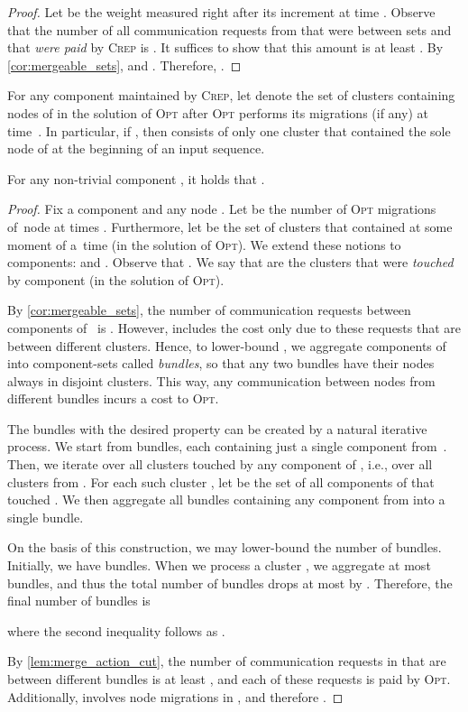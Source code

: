 \documentclass{siamart190516}
\newcommand{\OPT}{\textsc{Opt}\xspace}
\newcommand{\CREP}{\textsc{Crep}\xspace}
\begin{document}
\begin{proof}
Let  be the weight measured right after its increment at time .
Observe that the number of all communication requests from  that were
between sets  and that \emph{were paid} by \CREP is . It suffices to show that this amount is at least . By \cref{cor:mergeable_sets},  and . Therefore, .
\end{proof}

For any component  maintained by \CREP, let  denote the set of clusters
containing nodes of  in the solution of \OPT after \OPT performs its
migrations (if any) at time~. In particular, if , then
 consists of only one cluster that contained the sole node of  
at the beginning of an input sequence.

\begin{lemma}
\label{lem:opt_recursive_bound}
For any non-trivial component , it holds that .
\end{lemma}

\begin{proof}
Fix a component  and any node . Let  be the
number of \OPT migrations of~node  at times . Furthermore, let  be the set of clusters that
contained  at some moment of a~time  (in the solution of \OPT). We extend these notions to components:
 and .
Observe that .
We say that  are the clusters that were \emph{touched} by component  
(in the solution of \OPT).

By \cref{cor:mergeable_sets}, the number of communication requests between
components of~ is . However, 
includes the cost only due to these requests that are between different clusters.
Hence, to lower-bound , we aggregate components of~ into
component-sets called \emph{bundles}, so that any two bundles have their nodes
always in disjoint clusters. This way, any communication between nodes from
different bundles incurs a cost to \OPT.

The bundles with the desired property can be created by a natural iterative 
process. We start from  bundles, each containing just a single 
component from~. Then, we iterate over all clusters touched 
by any component of , i.e., over all clusters from .
For each such cluster , let  be the set 
of all components of  that touched . We then aggregate all bundles 
containing any component from  into a single bundle.

On the basis of this construction, we may lower-bound the number of 
bundles. Initially, we have  bundles. When we process a cluster , we aggregate at most  bundles, and thus
the total number of bundles drops at most by . Therefore, the final number of bundles 
is 

where the second inequality follows as .

By \cref{lem:merge_action_cut}, the number of communication requests in
 that are between different bundles is at least ,
and each of these requests is paid by \OPT.
Additionally,  involves  node migrations in , and therefore .
\end{proof}
\end{document}
